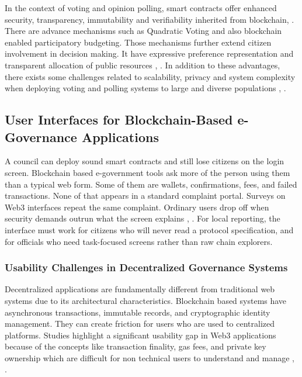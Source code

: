 In the context of voting and opinion polling, smart contracts offer enhanced security, transparency, immutability and verifiability inherited from blockchain\cite{ResearchGate_2024_ScalableEVoting}, \cite{IEEE_2024_BPVot}. There are advance mechanisms such as Quadratic Voting and also blockchain enabled participatory budgeting. Those mechanisms further extend citizen involvement in decision making. It have expressive preference representation and transparent allocation of public resources \cite{ResearchGate_2021_QuadraticVoting}, \cite{UPSpace_2022_ParticipatoryBudgeting}. In addition to these advantages, there exists some challenges related to scalability, privacy and system complexity when deploying voting and polling systems to large and diverse populations \cite{ResearchGate_2024_ScalableEVoting}, \cite{JournalOfCybersecurity_2020_BlockchainVoting}.

\subsection{User Interfaces for Blockchain-Based e-Governance Applications}

A council can deploy sound smart contracts and still lose citizens on the login screen. Blockchain based e-government tools ask more of the person using them than a typical web form. Some of them are wallets, confirmations, fees, and failed transactions. None of that appears in a standard complaint portal. Surveys on Web3 interfaces repeat the same complaint. Ordinary users drop off when security demands outrun what the screen explains \cite{mdpi2025usercentric}, \cite{sonule2025uxweb3}. For local reporting, the interface must work for citizens who will never read a protocol specification, and for officials who need task-focused screens rather than raw chain explorers.

\subsubsection*{Usability Challenges in Decentralized Governance Systems}

Decentralized applications are fundamentally different from traditional web systems due to its architectural characteristics. Blockchain based systems have asynchronous transactions, immutable records, and cryptographic identity management. They can create friction for users who are used to centralized platforms. Studies highlight a significant usability gap in Web3 applications because of the concepts like transaction finality, gas fees, and private key ownership which are difficult for non technical users to understand and manage  \cite{mdpi2025usercentric}, \cite{sonule2025uxweb3}.

